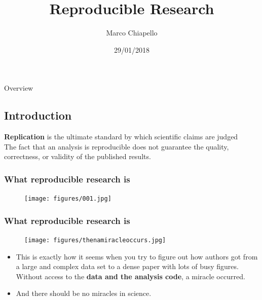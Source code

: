 \documentclass{beamer}
\title[Short title]{Reproducible Research}
\author{Marco Chiapello}
\institute[] 
{
\medskip
\textit{chiapello.m@gmail.com} 
}
\date{29/01/2018}
\begin{document}
\begin{frame}
\titlepage 
\end{frame}

\begin{frame}{Overview}
\small
\tableofcontents
\end{frame}


\begin{frame}
\section{Introduction} 
\vspace{50px}
\begin{flushright}
\scriptsize {\bf Replication} is the ultimate standard by which scientific claims are judged \citep{Peng:2011et}\\
\scriptsize The fact that an analysis is reproducible does not guarantee the quality, correctness, or validity of the published results. 
\end{flushright}
\end{frame}

\begin{frame}
\frametitle{What reproducible research is}
\begin{figure}
\texttt{[image: figures/001.jpg]}
\end{figure}
\end{frame}

\begin{frame}
\frametitle{What reproducible research is}
\begin{figure}
\texttt{[image: figures/thenamiracleoccurs.jpg]}
\end{figure}
\footnotesize
\begin{itemize}
	\item This is exactly how it seems when you try to figure out how authors got from a large and complex data set to a dense paper with lots of busy figures. \\Without access to the \textbf{data and the analysis code}, a miracle occurred.
\item And  there should be {\sc no miracles in science.} \citep{Markowetz:2016cs}
\end{itemize}
\end{frame}
\end{document}

